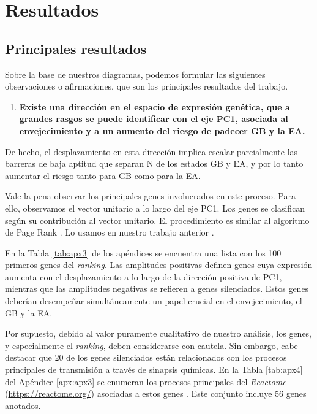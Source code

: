 \chapter{Resultados}
\label{cap3}
\onehalfspacing

\section{Principales resultados}

Sobre la base de nuestros diagramas, podemos formular las siguientes observaciones o afirmaciones, que son los principales resultados del trabajo.

\begin{enumerate}
	\item  \textbf{Existe una dirección en el espacio de expresión genética, que a grandes rasgos se puede identificar con el eje PC1, asociada al envejecimiento y a un aumento del riesgo de padecer GB y la EA.}
\end{enumerate}

De hecho, el desplazamiento en esta dirección implica escalar parcialmente las barreras de baja aptitud que separan N de los estados GB y EA, y por lo tanto aumentar el riesgo tanto para GB como para la EA.

Vale la pena observar los principales genes involucrados en este proceso. Para ello, observamos el vector unitario a lo largo del eje PC1. Los genes se clasifican según su contribución al vector unitario. \alert{El procedimiento es similar al algoritmo de Page Rank \cite{Duhan_2009}. Lo usamos en nuestro trabajo anterior \cite{Gonzalez_2023}.}

En la Tabla \ref{tab:apx3} de los apéndices se encuentra una lista con los 100 primeros genes del \textit{ranking}. Las amplitudes positivas definen genes cuya expresión aumenta con el desplazamiento a lo largo de la dirección positiva de PC1, mientras que las amplitudes negativas se refieren a genes silenciados. Estos genes deberían desempeñar simultáneamente un papel crucial en el envejecimiento, el GB y la EA.

Por supuesto, debido al valor puramente cualitativo de nuestro análisis, los genes, y especialmente el \textit{ranking}, deben considerarse con cautela. Sin embargo, cabe destacar que 20 de los genes silenciados están relacionados con los procesos principales de transmisión a través de sinapsis químicas. En la Tabla \ref{tab:apx4} del Apéndice \ref{apx:apx3} se enumeran los procesos principales del \textit{Reactome} (\href{https://reactome.org/}{https://reactome.org/}) asociadas a estos genes \cite{Gillespie_2021}. Este conjunto incluye 56 genes anotados.

